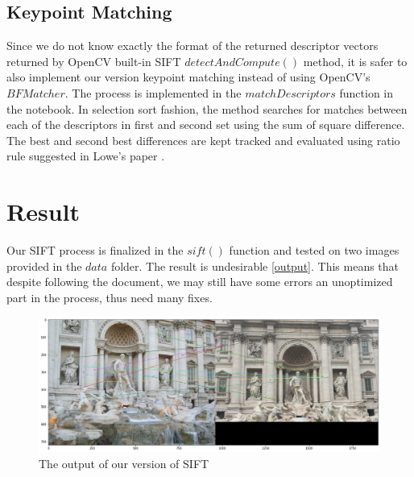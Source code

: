 \documentclass{article}
\begin{document}
\begin{multicols}{2}
	\subsection{Keypoint Matching}
	Since we do not know exactly the format of the returned descriptor vectors returned by OpenCV built-in SIFT $detectAndCompute()$ method, it is safer to also implement our version keypoint matching instead of using OpenCV's $BFMatcher$. The process is implemented in the $matchDescriptors$ function in the notebook. In selection sort fashion, the method searches for matches between each of the descriptors in first and second set using the sum of square difference. The best and second best differences are kept tracked and evaluated using ratio rule suggested in Lowe's paper \cite{Lowe:2004:DIF:993451.996342}.
	
	\section{Result}
	Our SIFT process is finalized in the $sift()$ function and tested on two images provided in the $data$ folder. The result is undesirable \ref{output}. This means that despite following the document, we may still have some errors an unoptimized part in the process, thus need many fixes.
	
	\begin{figure}
		\centering
		\includegraphics[width=0.8\linewidth]{output.png}
		\caption{\label{fig:output} The output of our version of SIFT}
	\end{figure}
	
\end{multicols}

\newpage
\nocite{*}


		
\end{document}
